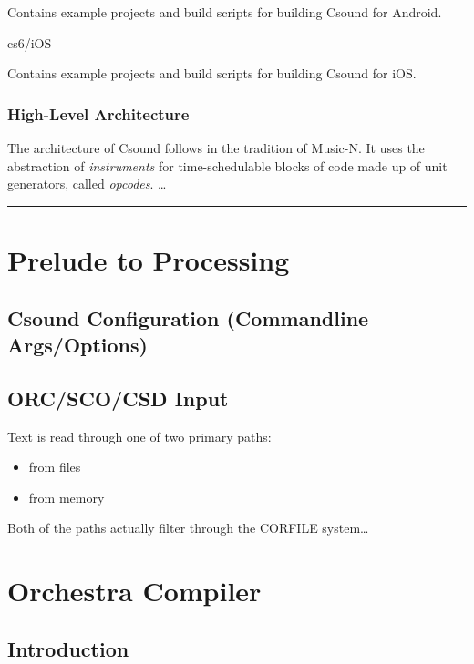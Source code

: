 \documentclass[]{book}
\begin{document}
Contains example projects and build scripts for building Csound for
Android.

cs6/iOS

Contains example projects and build scripts for building Csound for iOS.

\subsection{High-Level Architecture}

The architecture of Csound follows in the tradition of Music-N. It uses
the abstraction of \emph{instruments} for time-schedulable blocks of
code made up of unit generators, called \emph{opcodes}. \ldots{}

\begin{center}\rule{3in}{0.4pt}\end{center}

\chapter{Prelude to Processing}

\section{Csound Configuration (Commandline Args/Options)}

\section{ORC/SCO/CSD Input}

Text is read through one of two primary paths:

\begin{itemize}
\itemsep1pt\parskip0pt
\item
  from files
\item
  from memory
\end{itemize}

Both of the paths actually filter through the CORFILE system\ldots{}

\chapter{Orchestra Compiler}

\section{Introduction}
\end{document}
